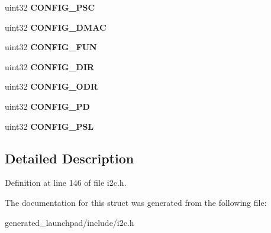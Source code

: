 \begin{DoxyCompactItemize}
uint32 {\bfseries C\+O\+N\+F\+I\+G\+\_\+\+P\+SC}
\item 
\mbox{\label{structi2c__config__reg_a1a8f72d67f7e6e00e505c2ff9af2996b}} 
uint32 {\bfseries C\+O\+N\+F\+I\+G\+\_\+\+D\+M\+AC}
\item 
\mbox{\label{structi2c__config__reg_a3db6219454dc6c4110f9d8be28e56c77}} 
uint32 {\bfseries C\+O\+N\+F\+I\+G\+\_\+\+F\+UN}
\item 
\mbox{\label{structi2c__config__reg_a94860f3fcc0316231dd78cb0e6f05413}} 
uint32 {\bfseries C\+O\+N\+F\+I\+G\+\_\+\+D\+IR}
\item 
\mbox{\label{structi2c__config__reg_a71d8ff51275efd8ee11bd5c7bf186abb}} 
uint32 {\bfseries C\+O\+N\+F\+I\+G\+\_\+\+O\+DR}
\item 
\mbox{\label{structi2c__config__reg_a92e2e96fcc550600ce7bfcc720ca25dd}} 
uint32 {\bfseries C\+O\+N\+F\+I\+G\+\_\+\+PD}
\item 
\mbox{\label{structi2c__config__reg_a0ee7817995aa413fc04877e96d7744ea}} 
uint32 {\bfseries C\+O\+N\+F\+I\+G\+\_\+\+P\+SL}
\end{DoxyCompactItemize}


\subsection{Detailed Description}


Definition at line 146 of file i2c.\+h.



The documentation for this struct was generated from the following file\+:\begin{DoxyCompactItemize}
\item 
generated\+\_\+launchpad/include/i2c.\+h\end{DoxyCompactItemize}
